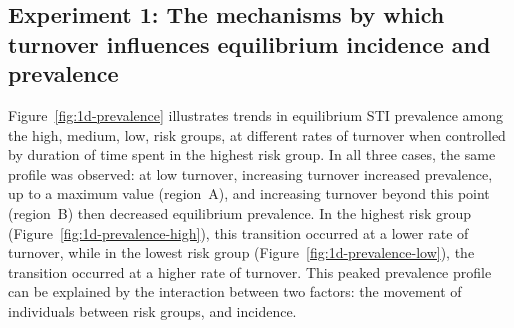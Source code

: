 \subsection{Experiment 1: The mechanisms by which turnover influences equilibrium incidence and prevalence}
\label{ss:res-prev-inc}
Figure~\ref{fig:1d-prevalence} illustrates trends in equilibrium STI prevalence  %
among the high, medium, low, risk groups, at different rates of turnover when controlled by duration 
of time spent in the highest risk group.
In all three cases, the same profile was observed: %
at low turnover, increasing turnover increased prevalence, up to a maximum value (region~A),
and increasing turnover beyond this point (region~B) then decreased equilibrium prevalence.
In the highest risk group (Figure~\ref{fig:1d-prevalence-high}),
this transition occurred at a lower rate of turnover,
while in the lowest risk group (Figure~\ref{fig:1d-prevalence-low}),
the transition occurred at a higher rate of turnover.
This peaked prevalence profile can be explained by the interaction between two factors:
the movement of individuals between risk groups, and
incidence.
